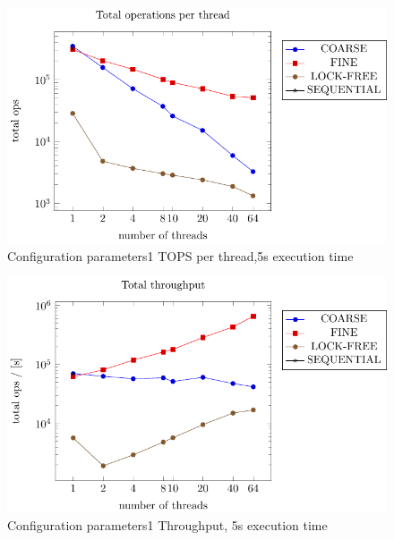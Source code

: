 \documentclass{article}
\begin{document}
    \begin{figure}[H]
        \centering
        \includegraphics{../plots/parameters1_5s_per_thread.pdf}
        \caption{Configuration parameters1 TOPS per thread,5s execution time}
       
        \label{fig:parameters1_5s_per_thread}
    \end{figure}

    \begin{figure}[H]
        \centering
        \includegraphics{../plots/parameters1_5s_throughput.pdf}
        \caption{Configuration parameters1 Throughput, 5s execution time}
        \label{fig:parameters1_5s_throughput}
    \end{figure}
\end{document}
